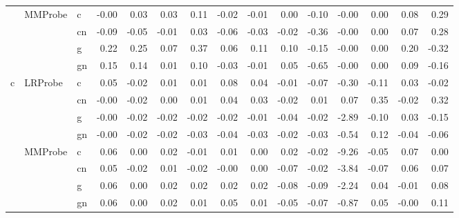 \begin{tabular}{lllrrrrrrrrrrrr}
 & \multirow[t]{4}{*}{MMProbe} & c & -0.00 & 0.03 & 0.03 & 0.11 & -0.02 & -0.01 & 0.00 & -0.10 & -0.00 & 0.00 & 0.08 & 0.29 \\
 &  & cn & -0.09 & -0.05 & -0.01 & 0.03 & -0.06 & -0.03 & -0.02 & -0.36 & -0.00 & 0.00 & 0.07 & 0.28 \\
 &  & g & 0.22 & 0.25 & 0.07 & 0.37 & 0.06 & 0.11 & 0.10 & -0.15 & -0.00 & 0.00 & 0.20 & -0.32 \\
 &  & gn & 0.15 & 0.14 & 0.01 & 0.10 & -0.03 & -0.01 & 0.05 & -0.65 & -0.00 & 0.00 & 0.09 & -0.16 \\
\cline{1-15} \cline{2-15}
\multirow[t]{8}{*}{c} & \multirow[t]{4}{*}{LRProbe} & c & 0.05 & -0.02 & 0.01 & 0.01 & 0.08 & 0.04 & -0.01 & -0.07 & -0.30 & -0.11 & 0.03 & -0.02 \\
 &  & cn & -0.00 & -0.02 & 0.00 & 0.01 & 0.04 & 0.03 & -0.02 & 0.01 & 0.07 & 0.35 & -0.02 & 0.32 \\
 &  & g & -0.00 & -0.02 & -0.02 & -0.02 & -0.02 & -0.01 & -0.04 & -0.02 & -2.89 & -0.10 & 0.03 & -0.15 \\
 &  & gn & -0.00 & -0.02 & -0.02 & -0.03 & -0.04 & -0.03 & -0.02 & -0.03 & -0.54 & 0.12 & -0.04 & -0.06 \\
\cline{2-15}
 & \multirow[t]{4}{*}{MMProbe} & c & 0.06 & 0.00 & 0.02 & -0.01 & 0.01 & 0.00 & 0.02 & -0.02 & -9.26 & -0.05 & 0.07 & 0.00 \\
 &  & cn & 0.05 & -0.02 & 0.01 & -0.02 & -0.00 & 0.00 & -0.07 & -0.02 & -3.84 & -0.07 & 0.06 & 0.07 \\
 &  & g & 0.06 & 0.00 & 0.02 & 0.02 & 0.02 & 0.02 & -0.08 & -0.09 & -2.24 & 0.04 & -0.01 & 0.08 \\
 &  & gn & 0.06 & 0.00 & 0.02 & 0.01 & 0.05 & 0.01 & -0.05 & -0.07 & -0.87 & 0.05 & -0.00 & 0.11 \\
\cline{1-15} \cline{2-15}
\bottomrule
\end{tabular}
